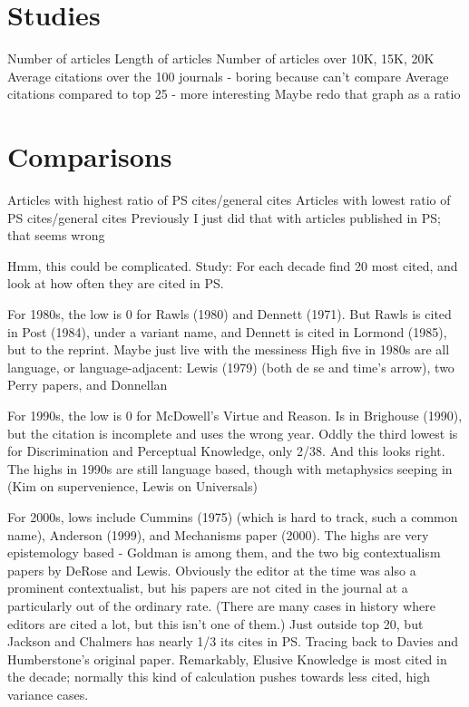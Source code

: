 \documentclass[
  10pt,
  letterpaper,
  DIV=11,
  numbers=noendperiod,
  twoside]{scrartcl}
\begin{document}
\section{Studies}\label{studies}

Number of articles Length of articles Number of articles over 10K, 15K,
20K Average citations over the 100 journals - boring because can't
compare Average citations compared to top 25 - more interesting Maybe
redo that graph as a ratio

\section{Comparisons}\label{comparisons}

Articles with highest ratio of PS cites/general cites Articles with
lowest ratio of PS cites/general cites Previously I just did that with
articles published in PS; that seems wrong

Hmm, this could be complicated. Study: For each decade find 20 most
cited, and look at how often they are cited in PS.

For 1980s, the low is 0 for Rawls (1980) and Dennett (1971). But Rawls
is cited in Post (1984), under a variant name, and Dennett is cited in
Lormond (1985), but to the reprint. Maybe just live with the messiness
High five in 1980s are all language, or language-adjacent: Lewis (1979)
(both de se and time's arrow), two Perry papers, and Donnellan

For 1990s, the low is 0 for McDowell's Virtue and Reason. Is in
Brighouse (1990), but the citation is incomplete and uses the wrong
year. Oddly the third lowest is for Discrimination and Perceptual
Knowledge, only 2/38. And this looks right. The highs in 1990s are still
language based, though with metaphysics seeping in (Kim on
supervenience, Lewis on Universals)

For 2000s, lows include Cummins (1975) (which is hard to track, such a
common name), Anderson (1999), and Mechanisms paper (2000). The highs
are very epistemology based - Goldman is among them, and the two big
contextualism papers by DeRose and Lewis. Obviously the editor at the
time was also a prominent contextualist, but his papers are not cited in
the journal at a particularly out of the ordinary rate. (There are many
cases in history where editors are cited a lot, but this isn't one of
them.) Just outside top 20, but Jackson and Chalmers has nearly 1/3 its
cites in PS. Tracing back to Davies and Humberstone's original paper.
Remarkably, Elusive Knowledge is most cited in the decade; normally this
kind of calculation pushes towards less cited, high variance cases.
\end{document}

